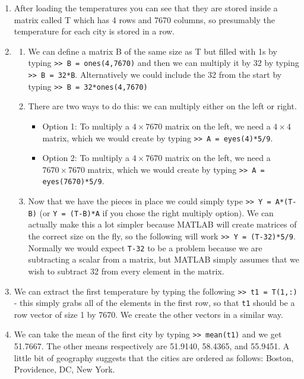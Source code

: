 \begin{sol}
\begin{enumerate}
    \item After loading the temperatures you can see that they are stored inside a matrix called T which has 4 rows and 7670 columns, so presumably the temperature for each city is stored in a row.
    \item
        \begin{enumerate}
            \item We can define a matrix B of the same size as T but filled with 1s by typing \texttt{>> B = ones(4,7670)} and then we can multiply it by 32 by typing \texttt{>> B = 32*B}. Alternatively we could include the 32 from the start by typing \texttt{>> B = 32*ones(4,7670)}
            \item There are two ways to do this: we can multiply either on the left or right.
            \begin{itemize}
                \item Option 1: To multiply a $4\times 7670$ matrix on the left, we need a $4 \times 4$ matrix, which we would create by typing \texttt{>>  A = eyes(4)*5/9}.
                \item Option 2: To multiply a $4\times 7670$ matrix on the left, we need a $7670 \times 7670$ matrix, which we would create by typing \texttt{>>  A = eyes(7670)*5/9}.
            \end{itemize}
            \item Now that we have the pieces in place we could simply type \texttt{>> Y = A*(T-B)} (or \texttt{Y = (T-B)*A} if you chose the right multiply option). We can actually make this a lot simpler because MATLAB will create matrices of the correct size on the fly, so the following will work \texttt{>> Y = (T-32)*5/9}. Normally we would expect \texttt{T-32} to be a problem because we are subtracting a scalar from a matrix, but MATLAB simply assumes that we wish to subtract 32 from every element in the matrix.
        \end{enumerate}
        
        \item We can extract the first temperature by typing the following \texttt{>> t1 = T(1,:)} - this simply grabs all of the elements in the first row, so that \texttt{t1} should be a row vector of size 1 by 7670. We create the other vectors in a similar way.
        
        \item We can take the mean of the first city by typing \texttt{>> mean(t1)} and we get 51.7667. The other means respectively are 51.9140, 58.4365, and 55.9451. A little bit of geography suggests that the cities are ordered as follows: Boston, Providence, DC, New York.
        

\end{enumerate}
\end{sol}
